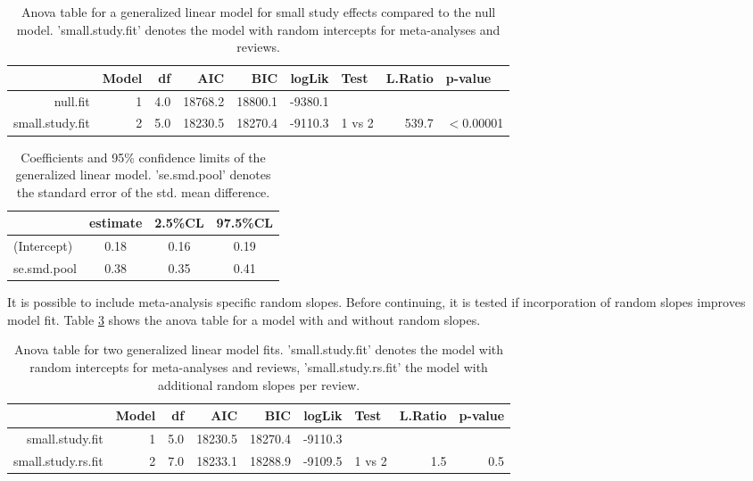 \documentclass[11pt,a4paper,twoside]{book}\usepackage[]{graphicx}\usepackage[]{color}
\begin{document}
\begin{table}[ht]
\centering
\begingroup\scriptsize
\begin{tabular}{rrrrrrlrl}
  \hline
 & Model & df & AIC & BIC & logLik & Test & L.Ratio & p-value \\ 
  \hline
null.fit &  1 & 4.0 & 18768.2 & 18800.1 & -9380.1 &  &  &  \\ 
  small.study.fit &  2 & 5.0 & 18230.5 & 18270.4 & -9110.3 & 1 vs 2 & 539.7 & $<$0.00001 \\ 
   \hline
\end{tabular}
\endgroup
\caption{Anova table for a generalized linear model for small study effects compared to the null model. 'small.study.fit' denotes the model with random intercepts for meta-analyses and reviews.} 
\label{anova.small.study}
\end{table}


\begin{table}[ht]
\centering
\begingroup\scriptsize
\begin{tabular}{lccc}
  \hline
 & estimate & 2.5\%CL & 97.5\%CL \\ 
  \hline
(Intercept) & 0.18 & 0.16 & 0.19 \\ 
  se.smd.pool & 0.38 & 0.35 & 0.41 \\ 
   \hline
\end{tabular}
\endgroup
\caption{Coefficients and 95\% confidence limits of the generalized linear model. 'se.smd.pool' denotes the standard error of the std. mean difference.} 
\label{coefficients.small.study}
\end{table}


It is possible to include meta-analysis specific random slopes. Before continuing, it is tested if incorporation of random slopes improves model fit. Table \ref{anova.random.slopes} shows the anova table for a model with and without random slopes.

\begin{table}[ht]
\centering
\begingroup\scriptsize
\begin{tabular}{rrrrrrlrr}
  \hline
 & Model & df & AIC & BIC & logLik & Test & L.Ratio & p-value \\ 
  \hline
small.study.fit &  1 & 5.0 & 18230.5 & 18270.4 & -9110.3 &  &  &  \\ 
  small.study.rs.fit &  2 & 7.0 & 18233.1 & 18288.9 & -9109.5 & 1 vs 2 & 1.5 & 0.5 \\ 
   \hline
\end{tabular}
\endgroup
\caption{Anova table for two generalized linear model fits. 'small.study.fit' denotes the model with random intercepts for meta-analyses and reviews, 'small.study.rs.fit' the model with additional random slopes per review.} 
\label{anova.random.slopes}
\end{table}
\end{document}
